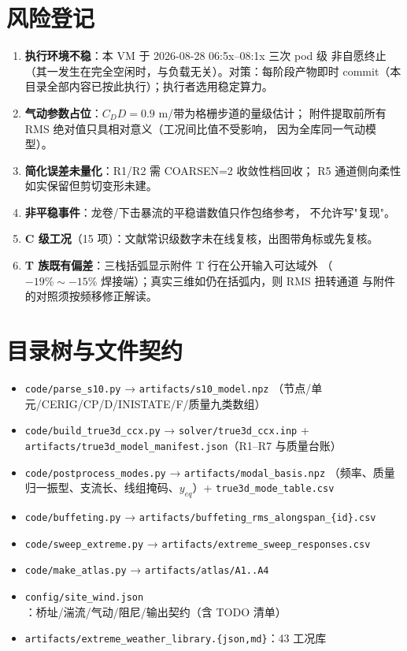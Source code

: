 \documentclass[11pt,a4paper]{ctexart}
\begin{document}
\section{风险登记}

\begin{enumerate}
  \item \textbf{执行环境不稳}：本 VM 于 2026-08-28 06:5x--08:1x 三次 pod 级
        非自愿终止（其一发生在完全空闲时，与负载无关）。对策：每阶段产物即时
        commit（本目录全部内容已按此执行）；执行者选用稳定算力。
  \item \textbf{气动参数占位}：$C_D D=0.9$ m/带为格栅步道的量级估计；
        附件提取前所有 RMS 绝对值只具相对意义（工况间比值不受影响，
        因为全库同一气动模型）。
  \item \textbf{简化误差未量化}：R1/R2 需 COARSEN=2 收敛性档回收；
        R5 通道侧向柔性如实保留但剪切变形未建。
  \item \textbf{非平稳事件}：龙卷/下击暴流的平稳谱数值只作包络参考，
        不允许写"复现"。
  \item \textbf{C 级工况}（15 项）：文献常识级数字未在线复核，出图带角标或先复核。

  \item \textbf{T 族既有偏差}：三栈括弧显示附件 T 行在公开输入可达域外
        （$-19\%\sim-15\%$ 焊接端）；真实三维如仍在括弧内，则 RMS 扭转通道
        与附件的对照须按频移修正解读。
\end{enumerate}

\appendix
\section{目录树与文件契约}

\begin{itemize}
  \item \texttt{code/parse\_s10.py} → \texttt{artifacts/s10\_model.npz}
        （节点/单元/CERIG/CP/D/INISTATE/F/质量九类数组）
  \item \texttt{code/build\_true3d\_ccx.py} → \texttt{solver/true3d\_ccx.inp} +
        \texttt{artifacts/true3d\_model\_manifest.json}（R1--R7 与质量台账）
  \item \texttt{code/postprocess\_modes.py} → \texttt{artifacts/modal\_basis.npz}
        （频率、质量归一振型、支流长、线组掩码、$y_{eq}$）+
        \texttt{true3d\_mode\_table.csv}
  \item \texttt{code/buffeting.py} →
        \texttt{artifacts/buffeting\_rms\_alongspan\_\{id\}.csv}
  \item \texttt{code/sweep\_extreme.py} → \texttt{artifacts/extreme\_sweep\_responses.csv}
  \item \texttt{code/make\_atlas.py} → \texttt{artifacts/atlas/A1..A4}
  \item \texttt{config/site\_wind.json}：桥址/湍流/气动/阻尼/输出契约（含 TODO 清单）
  \item \texttt{artifacts/extreme\_weather\_library.\{json,md\}}：43 工况库
\end{itemize}
\end{document}
